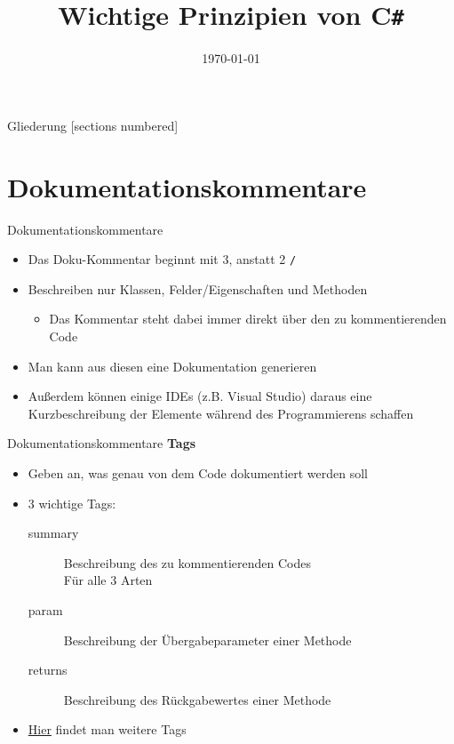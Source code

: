 



\title{Wichtige Prinzipien von C\texttt{\#}}
\date{\today}




\maketitle

\begin{frame}{Gliederung}
	[sections numbered]
	\tableofcontents
\end{frame}


\section{Dokumentationskommentare}
\begin{frame}{Dokumentationskommentare}
	\begin{itemize}
		\item Das Doku-Kommentar beginnt mit 3, anstatt 2 \texttt{\alert{/}}
		\item Beschreiben nur Klassen, Felder/Eigenschaften und Methoden
		\begin{itemize}
			\item Das Kommentar steht dabei immer direkt über den zu kommentierenden Code
		\end{itemize}
		\item Man kann aus diesen eine Dokumentation generieren
		\item Außerdem können einige IDEs (z.B. Visual Studio) daraus eine Kurzbeschreibung der Elemente während des Programmierens schaffen		
	\end{itemize}
\end{frame}

\begin{frame}{Dokumentationskommentare}
	\textbf{Tags}
	\begin{itemize}
		\item Geben an, was genau von dem Code dokumentiert werden soll
		\item 3 wichtige Tags:
		\begin{description}
			\item[summary] Beschreibung des zu kommentierenden Codes\\ Für alle 3 Arten
			\item[param] Beschreibung der Übergabeparameter einer Methode
			\item[returns] Beschreibung des Rückgabewertes einer Methode
		\end{description}
		\item \href{https://msdn.microsoft.com/de-de/library/5ast78ax.aspx}{\alert{Hier}} findet man weitere Tags
	\end{itemize}
\end{frame}

